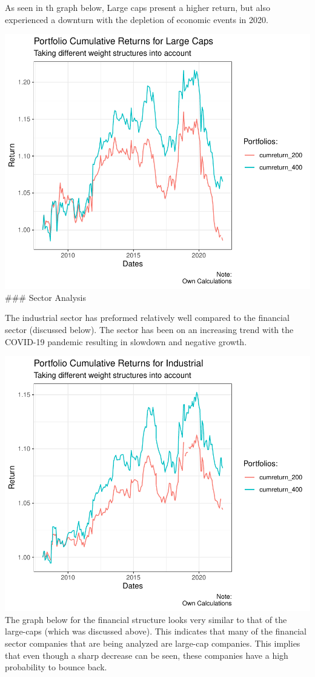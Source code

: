 \documentclass[11pt,preprint, authoryear]{elsarticle}
\numberwithin{equation}{section}
\numberwithin{figure}{section}
\numberwithin{table}{section}
\begin{document}
As seen in th graph below, Large caps present a higher return, but also
experienced a downturn with the depletion of economic events in 2020.

\includegraphics{Question2_files/figure-latex/unnamed-chunk-2-1.pdf}
\#\#\# Sector Analysis

The industrial sector has preformed relatively well compared to the
financial sector (discussed below). The sector has been on an increasing
trend with the COVID-19 pandemic resulting in slowdown and negative
growth.

\includegraphics{Question2_files/figure-latex/unnamed-chunk-3-1.pdf} The
graph below for the financial structure looks very similar to that of
the large-caps (which was discussed above). This indicates that many of
the financial sector companies that are being analyzed are large-cap
companies. This implies that even though a sharp decrease can be seen,
these companies have a high probability to bounce back.
\end{document}
